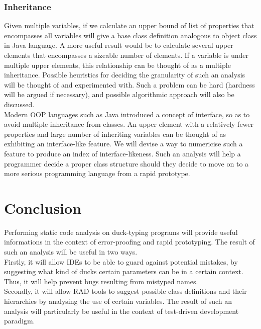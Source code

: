 \documentclass[a4paper,12pt]{article}
\begin{document}
\subsubsection{Inheritance}
Given multiple variables, if we calculate an upper bound of list of properties that encompasses all variables will give a base class definition analogous to object class in Java language. A more useful result would be to calculate several upper elements that encompasses a sizeable number of elements. If a variable is under multiple upper elements, this relationship can be thought of as a multiple inheritance. Possible heuristics for deciding the granularity of such an analysis will be thought of and experimented with. Such a problem can be hard (hardness will be argued if necessary), and possible algorithmic approach will also be discussed.\\
Modern OOP languages such as Java introduced a concept of interface, so as to avoid multiple inheritance from classes. An upper element with a relatively fewer properties and large number of inheriting variables can be thought of as exhibiting an interface-like feature. We will devise a way to numericise such a feature to produce an index of interface-likeness. Such an analysis will help a programmer decide a proper class structure should they decide to move on to a more serious programming language from a rapid prototype.
\section{Conclusion}
Performing static code analysis on duck-typing programs will provide useful informations in the context of error-proofing and rapid prototyping. The result of such an analysis will be useful in two ways.\\ 
Firstly, it will allow IDEs to be able to guard against potential mistakes, by suggesting what kind of ducks certain parameters can be in a certain context. Thus, it will help prevent bugs resulting from mistyped names.\\
Secondly, it will allow RAD tools to suggest possible class definitions and their hierarchies by analysing the use of certain variables. The result of such an analysis will particularly be useful in the context of test-driven development paradigm.\\
\end{document}
